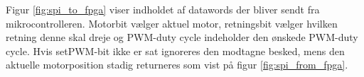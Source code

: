 Figur \ref{fig:spi_to_fpga} viser indholdet af datawords der bliver sendt fra mikrocontrolleren. 
Motorbit vælger aktuel motor, retningsbit vælger hvilken retning
denne skal dreje og PWM-duty cycle indeholder den ønskede PWM-duty cycle. 
Hvis setPWM-bit ikke er sat ignoreres den modtagne besked,
mens den aktuelle motorposition stadig returneres som vist på figur \ref{fig:spi_from_fpga}. 

